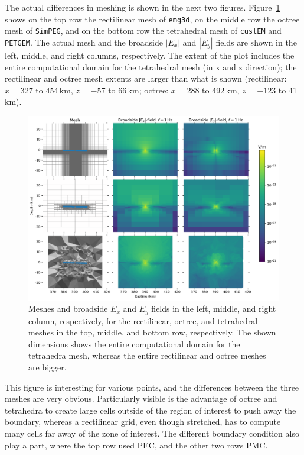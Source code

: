 \documentclass[onecolumn,extra,camera]{gji}
\newcommand{\emg}[2]{\texttt{emg#1#2}\xspace}
\newcommand{\simpeg}{\texttt{SimPEG}\xspace}
\newcommand{\custem}{\texttt{custEM}\xspace}
\newcommand{\petgem}{\texttt{PETGEM}\xspace}
\begin{document}
The actual differences in meshing is shown in the next two figures. Figure~\ref{fig:results-marlim_big} shows on the top row the rectilinear mesh of \emg3d, on the middle row the octree mesh of \simpeg, and on the bottom row the tetrahedral mesh of \custem and \petgem. The actual mesh and the broadside $|E_x|$ and $|E_y|$ fields are shown in the left, middle, and right columns, respectively. The extent of the plot includes the entire computational domain for the tetrahedral mesh (in x and z direction); the rectilinear and octree mesh extents are larger than what is shown (rectilinear: $x=327$ to 454\,km, $z=-57$ to 66\,km; octree: $x=288$ to 492\,km, $z=-123$ to 41\,km).
%
\begin{figure}
  \centering
  \includegraphics[width=.9\linewidth]{figures/results-marlim_big}
  \caption{Meshes and broadside $E_x$ and $E_y$ fields in the left, middle, and right column, respectively, for the rectilinear, octree, and tetrahedral meshes in the top, middle, and bottom row, respectively. The shown dimensions shows the entire computational domain for the tetrahedra mesh, whereas the entire rectilinear and octree meshes are bigger.}
  \label{fig:results-marlim_big}
\end{figure}
%
This figure is interesting for various points, and the differences between the three meshes are very obvious. Particularly visible is the advantage of octree and tetrahedra to create large cells outside of the region of interest to push away the boundary, whereas a rectilinear grid, even though stretched, has to compute many cells far away of the zone of interest. The different boundary condition also play a part, where the top row used PEC, and the other two rows PMC.
\end{document}
